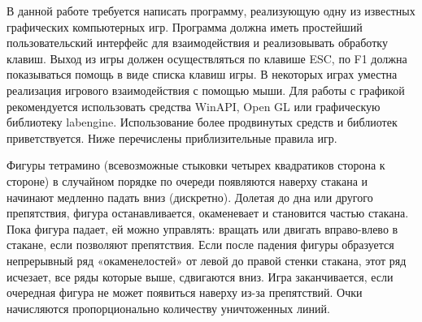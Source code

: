 
В данной работе требуется написать программу, реализующую одну из известных 
графических компьютерных игр. Программа должна иметь простейший пользовательский 
интерфейс для взаимодействия и реализовывать обработку клавиш. Выход из игры 
должен осуществляться по клавише ESC, по F1 должна показываться помощь в виде 
списка клавиш игры. В некоторых играх уместна реализация игрового взаимодействия 
с помощью мыши. Для работы с графикой рекомендуется использовать средства WinAPI,
Open GL или графическую библиотеку labengine. Использование
более продвинутых средств и библиотек приветствуется. Ниже перечислены 
приблизительные правила игр.

\zzsectionCOMMENTS

\zzsectionPLAN

\zzsectionVARIATIONS

\begin{zztask}[Tetris]
Фигуры тетрамино (всевозможные стыковки четырех квадратиков сторона к стороне)
в случайном порядке по очереди появляются наверху стакана и начинают медленно
падать вниз (дискретно). Долетая до дна или другого препятствия, фигура
останавливается, окаменевает и становится частью стакана. Пока фигура падает,
ей можно управлять: вращать или двигать вправо-влево в стакане, если позволяют
препятствия. Если после падения фигуры образуется непрерывный ряд
«окаменелостей» от левой до правой стенки стакана, этот ряд исчезает, все ряды
которые выше, сдвигаются вниз. Игра заканчивается, если очередная фигура не
может появиться наверху из-за препятствий. Очки начисляются пропорционально
количеству уничтоженных линий.
\end{zztask}


